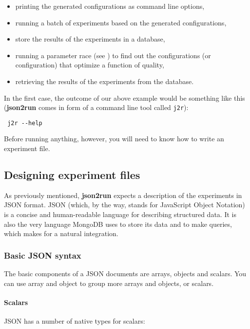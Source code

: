 \documentclass[11pt,notitlepage,twoside,a4paper]{article}
\begin{document}
\begin{itemize}
\item
  printing the generated configurations as command line options,
\item
  running a batch of experiments based on the generated configurations,
\item
  store the results of the experiments in a database,
\item
  running a parameter race (see \cite{Birattari2010}) to find out the configurations (or
  configuration) that optimize a function of quality,
\item
  retrieving the results of the experiments from the database.
\end{itemize}

In the first case, the outcome of our above example would be something
like this (\textbf{json2run} comes in form of a command line tool called
\texttt{j2r}):

\begin{lstlisting}
 j2r --help
\end{lstlisting}

Before running anything, however, you will need to know how to write an
experiment file.

\subsection{Designing experiment files}

As previously mentioned, \textbf{json2run} expects a description of the
experiments in JSON format. JSON (which, by the way, stands for
JavaScript Object Notation) is a concise and human-readable language for
describing structured data. It is also the very language MongoDB uses to
store its data and to make queries, which makes for a natural
integration.

\subsubsection{Basic JSON syntax}

The basic components of a JSON documents are arrays, objects and
scalars. You can use array and object to group more arrays and objects,
or scalars.

\paragraph{Scalars}
\noindent
JSON has a number of native types for scalars:
\end{document}
